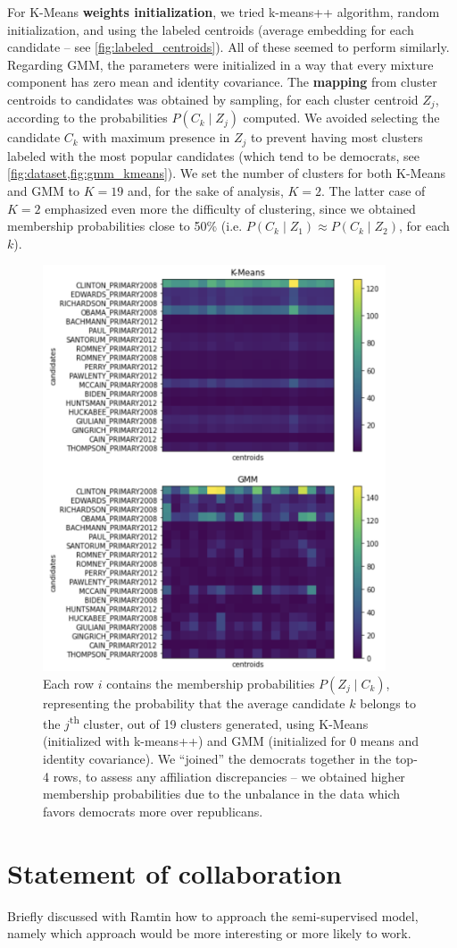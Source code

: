 \documentclass[11pt]{article}
\begin{document}
For K-Means \textbf{weights initialization}, we tried k-means++ algorithm, random initialization, and using the labeled centroids (average embedding for each candidate -- see \cref{fig:labeled_centroids}). All of these seemed to perform similarly. Regarding GMM, the parameters were initialized in a way that every mixture component has zero mean and identity covariance. The \textbf{mapping} from cluster centroids to candidates was obtained by sampling, for each cluster centroid $Z_j$, according to the probabilities $P(C_k \mid Z_j)$ computed. We avoided selecting the candidate $C_k$ with maximum presence in $Z_j$ to prevent having most clusters labeled with the most popular candidates (which tend to be democrats, see \cref{fig:dataset,fig:gmm_kmeans}). We set the number of clusters for both K-Means and GMM to $K=19$ and, for the sake of analysis, $K=2$. The latter case of $K=2$ emphasized even more the difficulty of clustering, since we obtained membership probabilities close to 50\% (i.e. $P(C_k\mid Z_1)\approx P(C_k\mid Z_2)$, for each $k$).

\begin{figure}[t]
\centering
  \includegraphics[width=4in]{figures/gmm_kmeans.png}
  \caption{Each row $i$ contains the membership probabilities $P(Z_j \mid C_k)$, representing the probability that the average candidate $k$ belongs to the $j$\textsuperscript{th} cluster, out of 19 clusters generated, using K-Means (initialized with k-means++) and GMM (initialized for 0 means and identity covariance). We ``joined'' the democrats together in the top-4 rows, to assess any affiliation discrepancies -- we obtained higher membership probabilities due to the unbalance in the data which favors democrats more over republicans.}
  \label{fig:gmm_kmeans}
\end{figure}

\section{Statement of collaboration}

Briefly discussed with Ramtin how to approach the semi-supervised model, namely which approach would be more interesting or more likely to work.
\end{document}
